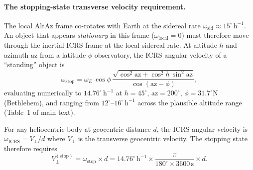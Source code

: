 \documentclass[11pt,a4paper]{article}
\begin{document}
\paragraph{The stopping-state transverse velocity requirement.}
The local AltAz frame co-rotates with Earth at the sidereal rate
$\omega_\mathrm{sid} \approx 15^\circ\,\mathrm{h}^{-1}$.
An object that appears \emph{stationary} in this frame
($\omega_\mathrm{local} = 0$) must therefore move through the inertial ICRS
frame at the local sidereal rate. At altitude $h$ and azimuth $\mathrm{az}$
from a latitude $\phi$ observatory, the ICRS angular velocity of a
``standing'' object is
\begin{equation}
  \omega_\mathrm{stop} = \omega_E\,\cos\phi\,
  \frac{\sqrt{\cos^2\!\mathrm{az} + \cos^2\! h\,\sin^2\!\mathrm{az}}}
       {\cos(\mathrm{az}-\phi)},
\end{equation}
evaluating numerically to $14.76^\circ\,\mathrm{h}^{-1}$ at
$h = 45^\circ$, $\mathrm{az} = 200^\circ$, $\phi = 31.7^\circ$N
(Bethlehem), and ranging from $12^\circ$--$16^\circ\,\mathrm{h}^{-1}$
across the plausible altitude range (Table~1 of main text).

For any heliocentric body at geocentric distance $d$, the ICRS angular
velocity is $\omega_\mathrm{ICRS} = V_\perp/d$ where $V_\perp$ is the
transverse geocentric velocity. The stopping state therefore requires
\begin{equation}
  V_\perp^\mathrm{(stop)} = \omega_\mathrm{stop} \times d
  = 14.76^\circ\,\mathrm{h}^{-1} \times \frac{\pi}{180^\circ\times3600\,\mathrm{s}} \times d.
\end{equation}
\end{document}
